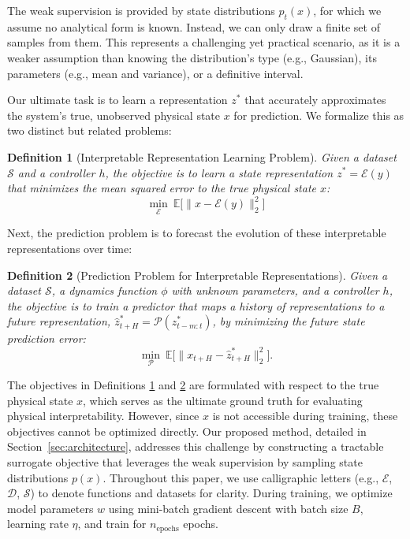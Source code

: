 \documentclass[nonacm,sigconf]{acmart}
\newtheorem{definition}{Definition}
\begin{document}
The weak supervision is provided by state distributions \( p_t(x) \), for which we assume no analytical form is known. Instead, we can only draw a finite set of samples from them. This represents a challenging yet practical scenario, as it is a weaker assumption than knowing the distribution's type (e.g., Gaussian), its parameters (e.g., mean and variance), or a definitive interval. 

Our ultimate task is to learn a representation \( z^* \) that accurately approximates the system’s true, unobserved physical state \( x \) for prediction. We formalize this as two distinct but related problems:

\begin{definition}[Interpretable Representation Learning Problem]
Given a dataset \( \mathcal{S} \) and a controller \( h \), the objective is to \emph{learn a state representation} \( z^* = \mathcal{E}(y) \) that minimizes the mean squared error to the true physical state \( x \):
\begin{equation}
\min_{\mathcal{E}} \ \mathbb{E} \big[ \| x - \mathcal{E}(y) \|_2^2 \big]
\end{equation}
\label{def:repprob}
\end{definition}

Next, the prediction problem is to forecast the evolution of these interpretable representations over time:

\begin{definition}[Prediction Problem for Interpretable Representations]
Given a dataset \( \mathcal{S} \), a dynamics function \( \phi \) with unknown parameters, and a controller \( h \), the objective is to \emph{train a predictor} that maps a history of representations to a future representation, \( \hat{z}^*_{t+H} = \mathcal{P}(z^*_{t-m:t}) \), by minimizing the future state prediction error:
\begin{equation}
\min_{\mathcal{P}} \ \mathbb{E} \big[ \| x_{t+H} - \hat{z}^*_{t+H} \|_2^2 \big].
\end{equation}
\label{def:predprob}
\end{definition}

The objectives in Definitions \ref{def:repprob} and \ref{def:predprob} are formulated with respect to the true physical state \( x \), which serves as the ultimate ground truth for evaluating physical interpretability. However, since \( x \) is not accessible during training, these objectives cannot be optimized directly. Our proposed method, detailed in Section~\ref{sec:architecture}, addresses this challenge by constructing a tractable surrogate objective that leverages the weak supervision by sampling state distributions \( p(x) \). Throughout this paper, we use calligraphic letters (e.g., $\mathcal{E}$, $\mathcal{D}$, $\mathcal{S}$) to denote functions and datasets for clarity. During training, we optimize model parameters $w$ using mini-batch gradient descent with batch size $B$, learning rate $\eta$, and train for $n_{\text{epochs}}$ epochs.
\end{document}

